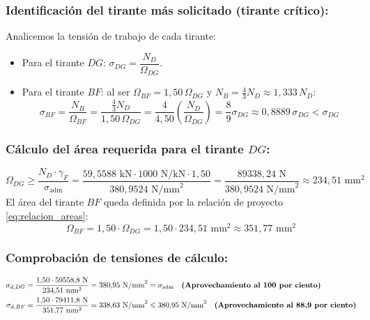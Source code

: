\subsubsection*{Identificación del tirante más solicitado (tirante crítico):}
Analicemos la tensión de trabajo de cada tirante:
\begin{itemize}
    \item Para el tirante $DG$: $\sigma_{DG} = \dfrac{N_D}{\Omega_{DG}}$.
    \item Para el tirante $BF$: al ser $\Omega_{BF} = 1{,}50\,\Omega_{DG}$ y $N_B = \frac{4}{3}N_D \approx 1{,}333\,N_D$:
          \begin{equation}
              \sigma_{BF} = \frac{N_B}{\Omega_{BF}} = \frac{\frac{4}{3}N_D}{1{,}50\,\Omega_{DG}} = \frac{4}{4{,}50} \left(\frac{N_D}{\Omega_{DG}}\right) = \frac{8}{9} \sigma_{DG} \approx 0{,}8889\,\sigma_{DG} < \sigma_{DG}
          \end{equation}
\end{itemize}

\subsubsection*{Cálculo del área requerida para el tirante $DG$:}
\begin{equation}
    \Omega_{DG} \geq \frac{N_D \cdot \gamma_F}{\sigma_{\text{adm}}} = \frac{59{,}5588\text{ kN} \cdot 1000\text{ N/kN} \cdot 1{,}50}{380{,}9524\text{ N/mm}^2} = \frac{89338{,}24\text{ N}}{380{,}9524\text{ N/mm}^2} \approx \boxed{234{,}51\text{ mm}^2}
\end{equation}
El área del tirante $BF$ queda definida por la relación de proyecto \eqref{eq:relacion_areas}:
\begin{equation}
    \Omega_{BF} = 1{,}50 \cdot \Omega_{DG} = 1{,}50 \cdot 234{,}51\text{ mm}^2 \approx \boxed{351{,}77\text{ mm}^2}
\end{equation}

\subsubsection*{Comprobación de tensiones de cálculo:}
\begin{align}
    \sigma_{d,DG} & = \frac{1{,}50 \cdot 59558{,}8\text{ N}}{234{,}51\text{ mm}^2} = 380{,}95\text{ N/mm}^2 = \sigma_{\text{adm}} \quad \text{\textbf{(Aprovechamiento al 100 por ciento)}}          \\
    \sigma_{d,BF} & = \frac{1{,}50 \cdot 79411{,}8\text{ N}}{351{,}77\text{ mm}^2} = 338{,}63\text{ N/mm}^2 \leq 380{,}95\text{ N/mm}^2 \quad \text{\textbf{(Aprovechamiento al 88{,}9 por ciento)}}
\end{align}

